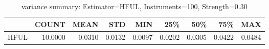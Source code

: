 \begin{table}[ht]
\centering
\caption{variance summary: Estimator=HFUL, Instruments=100, Strength=0.30}
\begin{tabular}{lrrrrrrrr}
\toprule
 & COUNT & MEAN & STD & MIN & 25\% & 50\% & 75\% & MAX \\
\midrule
HFUL & 10.0000 & 0.0310 & 0.0132 & 0.0097 & 0.0202 & 0.0305 & 0.0422 & 0.0484 \\
\bottomrule
\end{tabular}
\end{table}
